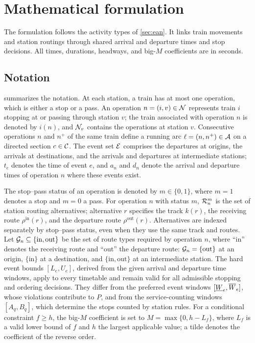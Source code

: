 \section{Mathematical formulation}\label{sec:model}
The formulation follows the activity types of \cref{sec:ean}. It links train movements and station routings through shared arrival and departure times and stop decisions. All times, durations, headways, and big-$M$ coefficients are in seconds.

\subsection{Notation}
 summarizes the notation. At each station, a train has at most one operation, which is either a stop or a pass. An operation $n=(i,v)\in\mathcal{N}$ represents train $i$ stopping at or passing through station $v$; the train associated with operation $n$ is denoted by $i(n)$, and $\mathcal{N}_v$ contains the operations at station $v$. Consecutive operations $n$ and $n^+$ of the same train define a running arc $\ell=(n,n^+)\in\mathcal{A}$ on a directed section $c\in\mathcal{C}$. The event set $\mathcal{E}$ comprises the departures at origins, the arrivals at destinations, and the arrivals and departures at intermediate stations; $t_e$ denotes the time of event $e$, and $a_n$ and $d_n$ denote the arrival and departure times of operation $n$ where these events exist.

The stop--pass status of an operation is denoted by $m\in\{0,1\}$, where $m=1$ denotes a stop and $m=0$ a pass. For operation $n$ with status $m$, $\mathcal{R}^m_n$ is the set of station routing alternatives; alternative $r$ specifies the track $k(r)$, the receiving route $\rho^{\mathrm{in}}(r)$, and the departure route $\rho^{\mathrm{out}}(r)$. Alternatives are indexed separately by stop--pass status, even when they use the same track and routes. Let $\mathcal{G}_n\subseteq\{\mathrm{in},\mathrm{out}\}$ be the set of route types required by operation $n$, where ``in'' denotes the receiving route and ``out'' the departure route: $\mathcal{G}_n=\{\mathrm{out}\}$ at an origin, $\{\mathrm{in}\}$ at a destination, and $\{\mathrm{in},\mathrm{out}\}$ at an intermediate station. The hard event bounds $[L_e,U_e]$, derived from the given arrival and departure time windows, apply to every timetable and remain valid for all admissible stopping and ordering decisions. They differ from the preferred event windows $[\underline{W}_e,\overline{W}_e]$, whose violations contribute to $P$, and from the service-counting windows $[A_q,B_q]$, which determine the stops counted by station rules. For a conditional constraint $f\ge h$, the big-$M$ coefficient is set to $M=\max\{0,h-L_f\}$, where $L_f$ is a valid lower bound of $f$ and $h$ the largest applicable value; a tilde denotes the coefficient of the reverse order.

